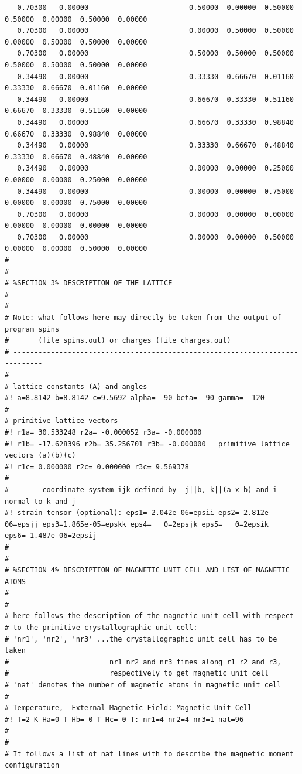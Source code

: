 {\begin{verbatim}
   0.70300   0.00000                        0.50000  0.00000  0.50000  0.50000  0.00000  0.50000  0.00000
   0.70300   0.00000                        0.00000  0.50000  0.50000  0.00000  0.50000  0.50000  0.00000
   0.70300   0.00000                        0.50000  0.50000  0.50000  0.50000  0.50000  0.50000  0.00000
   0.34490   0.00000                        0.33330  0.66670  0.01160  0.33330  0.66670  0.01160  0.00000
   0.34490   0.00000                        0.66670  0.33330  0.51160  0.66670  0.33330  0.51160  0.00000
   0.34490   0.00000                        0.66670  0.33330  0.98840  0.66670  0.33330  0.98840  0.00000
   0.34490   0.00000                        0.33330  0.66670  0.48840  0.33330  0.66670  0.48840  0.00000
   0.34490   0.00000                        0.00000  0.00000  0.25000  0.00000  0.00000  0.25000  0.00000
   0.34490   0.00000                        0.00000  0.00000  0.75000  0.00000  0.00000  0.75000  0.00000
   0.70300   0.00000                        0.00000  0.00000  0.00000  0.00000  0.00000  0.00000  0.00000
   0.70300   0.00000                        0.00000  0.00000  0.50000  0.00000  0.00000  0.50000  0.00000
#
#
# %SECTION 3% DESCRIPTION OF THE LATTICE
#
#
# Note: what follows here may directly be taken from the output of program spins 
#       (file spins.out) or charges (file charges.out)
# -----------------------------------------------------------------------------
#
# lattice constants (A) and angles 
#! a=8.8142 b=8.8142 c=9.5692 alpha=  90 beta=  90 gamma=  120
#
# primitive lattice vectors 
#! r1a= 30.533248 r2a= -0.000052 r3a= -0.000000
#! r1b= -17.628396 r2b= 35.256701 r3b= -0.000000   primitive lattice vectors (a)(b)(c)
#! r1c= 0.000000 r2c= 0.000000 r3c= 9.569378
#
#      - coordinate system ijk defined by  j||b, k||(a x b) and i normal to k and j
#! strain tensor (optional): eps1=-2.042e-06=epsii eps2=-2.812e-06=epsjj eps3=1.865e-05=epskk eps4=   0=2epsjk eps5=   0=2epsik eps6=-1.487e-06=2epsij
#
#
# %SECTION 4% DESCRIPTION OF MAGNETIC UNIT CELL AND LIST OF MAGNETIC ATOMS
#
#
# here follows the description of the magnetic unit cell with respect
# to the primitive crystallographic unit cell:
# 'nr1', 'nr2', 'nr3' ...the crystallographic unit cell has to be taken 
#                        nr1 nr2 and nr3 times along r1 r2 and r3,
#                        respectively to get magnetic unit cell
# 'nat' denotes the number of magnetic atoms in magnetic unit cell
#
# Temperature,  External Magnetic Field: Magnetic Unit Cell
#! T=2 K Ha=0 T Hb= 0 T Hc= 0 T: nr1=4 nr2=4 nr3=1 nat=96 
#
#
# It follows a list of nat lines with to describe the magnetic moment configuration

\end{verbatim}}
